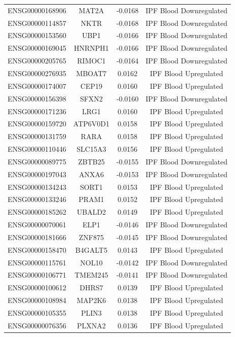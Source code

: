 \documentclass[
]{article}
\begin{document}
\begin{singlespace}
\begin{longtable}[t]{lccc}
ENSG00000168906 & MAT2A & -0.0168 & IPF Blood Downregulated\\
ENSG00000114857 & NKTR & -0.0168 & IPF Blood Downregulated\\
\addlinespace
ENSG00000153560 & UBP1 & -0.0166 & IPF Blood Downregulated\\
ENSG00000169045 & HNRNPH1 & -0.0166 & IPF Blood Downregulated\\
ENSG00000205765 & RIMOC1 & -0.0164 & IPF Blood Downregulated\\
ENSG00000276935 & MBOAT7 & 0.0162 & IPF Blood Upregulated\\
ENSG00000174007 & CEP19 & 0.0160 & IPF Blood Upregulated\\
\addlinespace
ENSG00000156398 & SFXN2 & -0.0160 & IPF Blood Downregulated\\
ENSG00000171236 & LRG1 & 0.0160 & IPF Blood Upregulated\\
ENSG00000159720 & ATP6V0D1 & 0.0158 & IPF Blood Upregulated\\
ENSG00000131759 & RARA & 0.0158 & IPF Blood Upregulated\\
ENSG00000110446 & SLC15A3 & 0.0156 & IPF Blood Upregulated\\
\addlinespace
ENSG00000089775 & ZBTB25 & -0.0155 & IPF Blood Downregulated\\
ENSG00000197043 & ANXA6 & -0.0153 & IPF Blood Downregulated\\
ENSG00000134243 & SORT1 & 0.0153 & IPF Blood Upregulated\\
ENSG00000133246 & PRAM1 & 0.0152 & IPF Blood Upregulated\\
ENSG00000185262 & UBALD2 & 0.0149 & IPF Blood Upregulated\\
\addlinespace
ENSG00000070061 & ELP1 & -0.0146 & IPF Blood Downregulated\\
ENSG00000181666 & ZNF875 & -0.0145 & IPF Blood Downregulated\\
ENSG00000158470 & B4GALT5 & 0.0143 & IPF Blood Upregulated\\
ENSG00000115761 & NOL10 & -0.0142 & IPF Blood Downregulated\\
ENSG00000106771 & TMEM245 & -0.0141 & IPF Blood Downregulated\\
\addlinespace
ENSG00000100612 & DHRS7 & 0.0139 & IPF Blood Upregulated\\
ENSG00000108984 & MAP2K6 & 0.0138 & IPF Blood Upregulated\\
ENSG00000105355 & PLIN3 & 0.0138 & IPF Blood Upregulated\\
ENSG00000076356 & PLXNA2 & 0.0136 & IPF Blood Upregulated\\

\end{longtable}
\end{singlespace}
\end{document}
